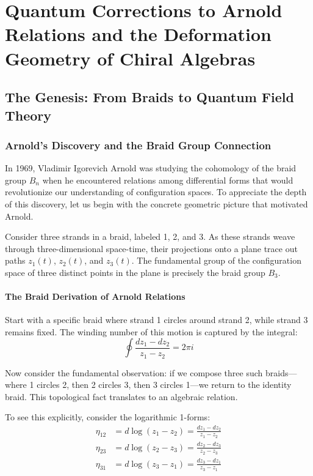\chapter{Quantum Corrections to Arnold Relations and the Deformation Geometry of Chiral Algebras}

\section{The Genesis: From Braids to Quantum Field Theory}

\subsection{Arnold's Discovery and the Braid Group Connection}

In 1969, Vladimir Igorevich Arnold was studying the cohomology of the braid group $B_n$ when he encountered relations among differential forms that would revolutionize our understanding of configuration spaces. To appreciate the depth of this discovery, let us begin with the concrete geometric picture that motivated Arnold.

Consider three strands in a braid, labeled 1, 2, and 3. As these strands weave through three-dimensional space-time, their projections onto a plane trace out paths $z_1(t)$, $z_2(t)$, and $z_3(t)$. The fundamental group of the configuration space of three distinct points in the plane is precisely the braid group $B_3$.

\subsubsection{The Braid Derivation of Arnold Relations}

Start with a specific braid where strand 1 circles around strand 2, while strand 3 remains fixed. The winding number of this motion is captured by the integral:
$$\oint \frac{dz_1 - dz_2}{z_1 - z_2} = 2\pi i$$

Now consider the fundamental observation: if we compose three such braids—where 1 circles 2, then 2 circles 3, then 3 circles 1—we return to the identity braid. This topological fact translates to an algebraic relation.

To see this explicitly, consider the logarithmic 1-forms:
\begin{align}
\eta_{12} &= d\log(z_1 - z_2) = \frac{dz_1 - dz_2}{z_1 - z_2} \\
\eta_{23} &= d\log(z_2 - z_3) = \frac{dz_2 - dz_3}{z_2 - z_3} \\
\eta_{31} &= d\log(z_3 - z_1) = \frac{dz_3 - dz_1}{z_3 - z_1}
\end{align}

